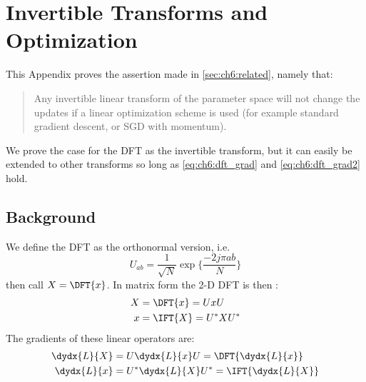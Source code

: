 \chapter{Invertible Transforms and Optimization} \label{app:ch6:invertible}
\def \path {freqlearn/}
\def \imgpath {freqlearn/images}
This Appendix proves the assertion made in \autoref{sec:ch6:related}, namely
that:
\begin{quote}
  Any invertible linear transform of the parameter space will not change the updates if a linear
  optimization scheme is used (for example standard gradient descent, or SGD with momentum).
\end{quote}
We prove the case for the DFT as the invertible transform, but it can easily be
extended to other transforms so long as \eqref{eq:ch6:dft_grad} and
\eqref{eq:ch6:dft_grad2} hold.

\section{Background}
We define the DFT as the orthonormal version, i.e.
$$ U_{ab} = \frac{1}{\sqrt{N}} \exp\{ \frac{-2j\pi ab}{N} \} $$
%
then call $X = \DFT{x}$. In matrix form the 2-D DFT is then
\cite[Chapter 2]{petrou_image_2010}:
\begin{align}
  X &= \DFT{x} = UxU \\
  x &= \IFT{X} = U^*XU^* 
\end{align}
The gradients of these linear operators are:
\begin{align}
  \dydx{L}{X} &= U \dydx{L}{x} U = \DFT{\dydx{L}{x}} \label{eq:ch6:dft_grad}\\
  \dydx{L}{x} &= U^* \dydx{L}{X} U^* = \IFT{\dydx{L}{X}} \label{eq:ch6:dft_grad2}
\end{align}

